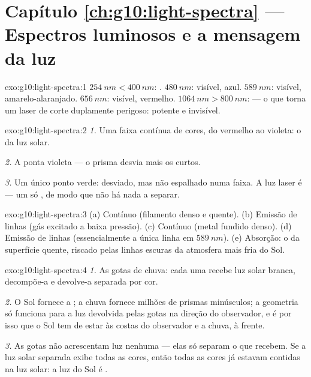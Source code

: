 \section*{Capítulo \ref{ch:g10:light-spectra} --- Espectros luminosos e a mensagem da luz}

\begin{solution}{exo:g10:light-spectra:1}
$\qty{254}{nm} < \qty{400}{nm}$: . $\qty{480}{nm}$: visível,
azul. $\qty{589}{nm}$: visível, amarelo-alaranjado. $\qty{656}{nm}$:
visível, vermelho. $\qty{1064}{nm} > \qty{800}{nm}$:  --- o que
torna um laser de corte duplamente perigoso: potente e invisível.
\end{solution}

\begin{solution}{exo:g10:light-spectra:2}
\emph{1.} Uma faixa contínua de cores, do vermelho ao violeta: o  da
luz solar.

\emph{2.} A ponta violeta --- o prisma desvia mais os 
curtos.

\emph{3.} Um único ponto verde: desviado, mas não espalhado numa faixa. A
luz laser é  --- um só , de modo que não há
nada a separar.
\end{solution}

\begin{solution}{exo:g10:light-spectra:3}
(a) Contínuo (filamento denso e quente). (b) Emissão de linhas (gás excitado
a baixa pressão). (c) Contínuo (metal fundido denso). (d) Emissão de linhas
(essencialmente a única linha em $\qty{589}{nm}$). (e) Absorção: o  da superfície quente, riscado pelas linhas escuras da atmosfera
mais fria do Sol.
\end{solution}

\begin{solution}{exo:g10:light-spectra:4}
\emph{1.} As gotas de chuva: cada uma recebe luz solar branca, decompõe-a e
devolve-a separada por cor.

\emph{2.} O Sol fornece a ; a chuva fornece milhões de prismas
minúsculos; a geometria só funciona para a luz devolvida pelas gotas na
direção do observador, e é por isso que o Sol tem de estar às costas do
observador e a chuva, à frente.

\emph{3.} As gotas não acrescentam luz nenhuma --- elas só separam o que
recebem. Se a luz solar separada exibe todas as cores, então todas as cores
já estavam contidas na luz solar: a luz do Sol é .
\end{solution}


